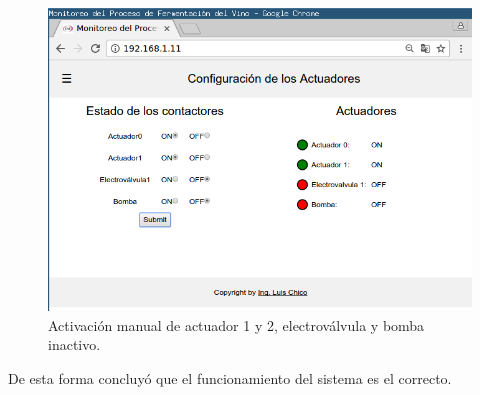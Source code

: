 \begin{figure}[h]
  \centering
  \includegraphics[width=1\linewidth]{./Figures/test_contact.png}
  \caption{Activación manual de actuador 1 y 2, electroválvula y bomba inactivo.}
  \label{fig:test_contact}
\end{figure}


De esta forma concluyó que el funcionamiento del sistema es el correcto.


